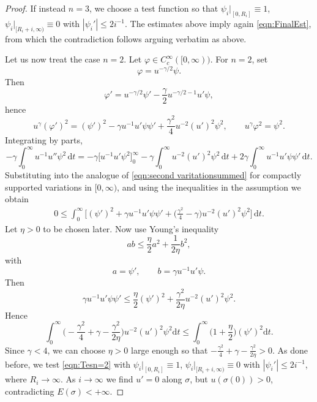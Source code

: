 \documentclass[12pt,a4paper,reqno]{amsart}
\theoremstyle{definition}
\renewcommand{\leq}{\leqslant}
\begin{document}
{\begin{proof}
    If instead $n=3$, we choose a test function so that $\psi_i|_{[0,R_i]}\equiv 1$, $\psi_i|_{[R_i+i,\infty)}\equiv 0$ with $|\psi_i'|\leq 2i^{-1}$. The estimates above imply again \eqref{eqn:FinalEst}, from which the contradiction follows arguing verbatim as above. 

    Let us now treat the case $n=2$. Let $\varphi\in C^\infty_c([0,\infty))$. For \(n=2\), set
\[
\varphi=u^{-\gamma/2}\psi.
\]
Then
\[
\varphi'=u^{-\gamma/2}\psi'-\frac{\gamma}{2}u^{-\gamma/2-1}u'\psi,
\]
hence
\[
u^\gamma(\varphi')^2
=(\psi')^2-\gamma u^{-1}u'\psi\psi'
+\frac{\gamma^2}{4}u^{-2}(u')^2\psi^2,
\qquad
u^\gamma\varphi^2=\psi^2.
\]
Integrating by parts,
\[
-\gamma\int_0^\infty u^{-1}u''\psi^2\,\mathrm{d}t
=
-\gamma\Big[u^{-1}u'\psi^2\Big]_0^\infty
-\gamma\int_0^\infty u^{-2}(u')^2\psi^2\,\mathrm{d}t
+2\gamma\int_0^\infty u^{-1}u'\psi\psi'\,\mathrm{d}t.
\]
Substituting into the analogue of \eqref{eqn:second varitationsummed} for compactly supported variations in $[0,\infty)$, 
and using the inequalities in the assumption we obtain
\[
\begin{aligned}
0\leq \int_0^\infty \Big[
(\psi')^2+\gamma u^{-1}u'\psi\psi'
+\Big(\frac{\gamma^2}{4}-\gamma\Big)u^{-2}(u')^2\psi^2
\Big]\,\mathrm{d}t.
\end{aligned}
\]
Let $\eta>0$ to be chosen later. Now use Young's inequality
\[
ab\le \frac{\eta}{2}a^2+\frac{1}{2\eta}b^2,
\]
with
\[
a=\psi',
\qquad
b=\gamma u^{-1}u'\psi.
\]
Then
\[
\gamma u^{-1}u'\psi\psi'
\le \frac{\eta}{2}(\psi')^2+\frac{\gamma^2}{2\eta}u^{-2}(u')^2\psi^2.
\]
Hence
\begin{equation}\label{eqn:Tesn=2}
\int_0^\infty \Big(-\frac{\gamma^2}{4}+\gamma-\frac{\gamma^2}{2\eta}\Big)u^{-2}(u')^2\psi^2 \mathrm{d}t \leq \int_0^\infty
\Big(1+\frac{\eta}{2}\Big)(\psi')^2\mathrm{d}t.
\end{equation}
Since $\gamma<4$, we can choose $\eta>0$ large enough so that $-\frac{\gamma^2}{4}+\gamma-\frac{\gamma^2}{2\eta}>0$. As done before, we test \eqref{eqn:Tesn=2} with $\psi_i|_{[0,R_i]}\equiv 1$, $\psi_i|_{[R_i+i,\infty)}\equiv 0$ with $|\psi_i'|\leq 2i^{-1}$, where $R_i\to\infty$. As $i\to \infty$ we find $u'=0$ along $\sigma$, but $u(\sigma(0))>0$, contradicting $E(\sigma)<+\infty$.
\end{proof}

}
\end{document}
